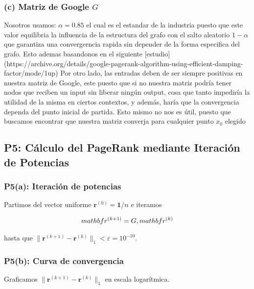 \documentclass{article}
\begin{document}
\subsubsection*{(c) Matriz de Google $G$}



Nosotros usamos: 
$\alpha = 0.85$ el cual es el estandar de la industria puesto que este valor equilibria la influencia de la estructura del grafo con el salto aleatorio $1 - \alpha$ que garantiza una convergerncia rapida sin depender de la forma especifica del grafo.
Esto ademas basandonos en el siguiente [estudio](https://archive.org/details/google-pagerank-algorithm-using-efficient-damping-factor/mode/1up)
Por otro lado, las entradas deben de ser siempre positivas en nuestra matriz de Google, este puesto que si no nuestra matriz podría tener nodos que reciben un input sin liberar ningún output, cosa que tanto impediría la utilidad de la misma en ciertos contextos, y además, haría que la convergencia dependa del punto inicial de partida. Esto mismo no nos es útil, puesto que buscamos encontrar que nuestra matriz converja para cualquier punto $x_0$ elegido




\subsection*{P5: Cálculo del PageRank mediante Iteración de Potencias}



\subsubsection*{P5(a): Iteración de potencias}

Partimos del vector uniforme $\mathbf{r}^{(0)} = \mathbf{1}/n$ e iteramos

$$\\mathbf{r}^{(k+1)} = G\\,\\mathbf{r}^{(k)}$$

hasta que $\|\mathbf{r}^{(k+1)} - \mathbf{r}^{(k)}\|_1 < \varepsilon = 10^{-10}$.



\subsubsection*{P5(b): Curva de convergencia}

Graficamos $\|\mathbf{r}^{(k+1)} - \mathbf{r}^{(k)}\|_1$ en escala logarítmica.  
\end{document}
